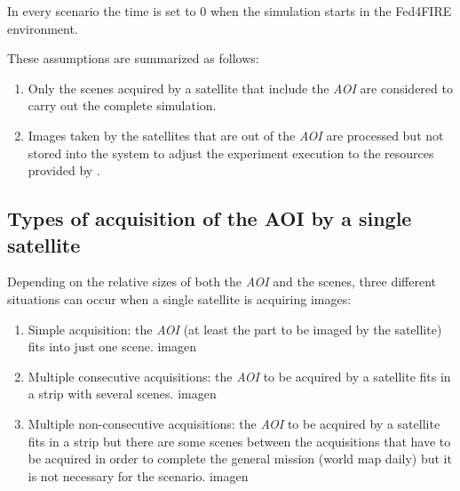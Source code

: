 In every scenario the time is set to 0 when the simulation starts in the Fed4FIRE environment.

These assumptions are summarized as follows:
\begin{enumerate}
\item Only the scenes acquired by a satellite that include the \emph{AOI} are considered to carry out the complete simulation.
\item Images taken by the satellites that are out of the \emph{AOI} are processed but
  not stored into the system to adjust the experiment execution to the resources
  provided by \bonfire.
\end{enumerate}

\subsection{Types of acquisition of the AOI by a single satellite}

Depending on the relative sizes of both the \emph{AOI} and the scenes, three different
situations can occur when a single satellite is acquiring images:
\begin{enumerate}
\item Simple acquisition: the \emph{AOI} (at least the part to be imaged by the
  satellite) fits into just one scene.
imagen

\item Multiple consecutive acquisitions: the \emph{AOI} to be acquired by a satellite
fits in a strip with several scenes.
imagen

\item Multiple non-consecutive acquisitions: the \emph{AOI} to be acquired by a
  satellite fits in a strip but there are some scenes between the acquisitions
  that have to be acquired in order to complete the general mission (world map
  daily) but it is not necessary for the scenario.
imagen

\end{enumerate}
